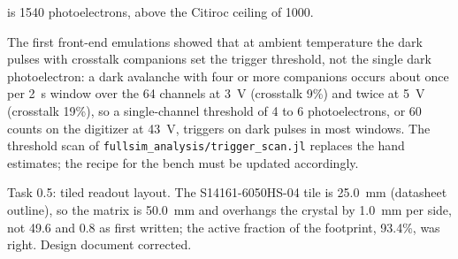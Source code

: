 \documentclass[11pt]{article}
\newcommand{\code}[1]{\texttt{#1}}
\newcommand{\us}{\textmu s\xspace}
\begin{document}
\begin{description}
  is 1540 photoelectrons, above the Citiroc ceiling of 1000.
\item[17 Oct 2026] The first front-end emulations showed that at ambient
  temperature the dark pulses with crosstalk companions set the trigger
  threshold, not the single dark photoelectron: a dark avalanche with four
  or more companions occurs about once per 2~\us window over the 64
  channels at 3~V (crosstalk 9\%) and twice at 5~V (crosstalk 19\%), so a
  single-channel threshold of 4 to 6 photoelectrons, or 60 counts on the
  digitizer at 43~V, triggers on dark pulses in most windows. The threshold
  scan of \code{fullsim\_analysis/trigger\_scan.jl} replaces the
  hand estimates; the recipe for the bench must be updated accordingly.
\item[17 Oct 2026] Task 0.5: tiled readout layout. The S14161-6050HS-04 tile
  is 25.0~mm (datasheet outline), so the matrix is 50.0~mm and overhangs the
  crystal by 1.0~mm per side, not 49.6 and 0.8 as first written; the active
  fraction of the footprint, 93.4\%, was right. Design document corrected.
\end{description}
\end{document}
